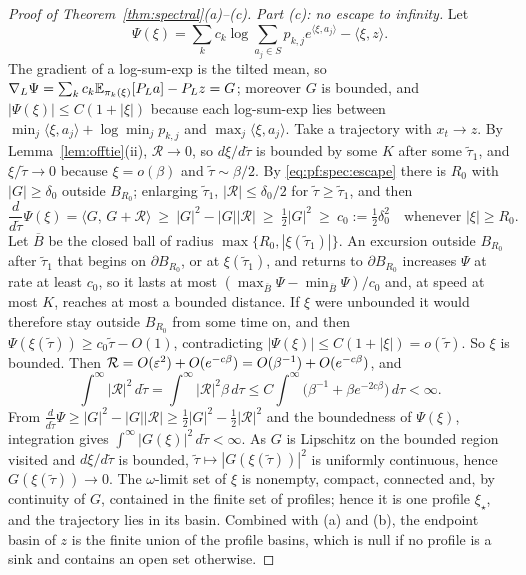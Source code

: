 \documentclass{article} %
\theoremstyle{plain}
\theoremstyle{definition}
\theoremstyle{remark}
\begin{document}
\begin{proof}[Proof of Theorem~\ref{thm:spectral}(a)--(c)]
\emph{Part (c): no escape to infinity.} Let
\[
\Psi(\xi)=\sum_kc_k\log\sum_{a_j\in S}p_{k,j}e^{\langle\xi,a_j\rangle}-\langle\xi,z\rangle .
\]
The gradient of a log-sum-exp is the tilted mean, so $\nabla_L\Psi=\sum_kc_k\mathbb{E}_{\pi_k(\xi)}[P_La]
-P_Lz=G$; moreover $G$ is bounded, and $|\Psi(\xi)|\le C(1+|\xi|)$ because each log-sum-exp lies
between $\min_j\langle\xi,a_j\rangle+\log\min_jp_{k,j}$ and $\max_j\langle\xi,a_j\rangle$. Take a
trajectory with $x_t\to z$. By Lemma~\ref{lem:offtie}(ii), $\mathcal R\to0$, so $d\xi/d\tilde\tau$ is
bounded by some $K$ after some $\tilde\tau_1$, and $\xi/\tilde\tau\to0$ because $\xi=o(\beta)$ and
$\tilde\tau\sim\beta/2$. By \eqref{eq:pf:spec:escape} there is $R_0$ with $|G|\ge\delta_0$ outside
$B_{R_0}$; enlarging $\tilde\tau_1$, $|\mathcal R|\le\delta_0/2$ for $\tilde\tau\ge\tilde\tau_1$, and then
\[
\frac{d}{d\tilde\tau}\Psi(\xi)=\langle G,\,G+\mathcal R\rangle\ \ge\ |G|^2-|G||\mathcal R|
\ \ge\ \tfrac12|G|^2\ \ge\ c_0:=\tfrac12\delta_0^2
\quad\text{whenever }|\xi|\ge R_0 .
\]
Let $\overline B$ be the closed ball of radius $\max\{R_0,|\xi(\tilde\tau_1)|\}$. An excursion outside
$B_{R_0}$ after $\tilde\tau_1$ that begins on $\partial B_{R_0}$, or at $\xi(\tilde\tau_1)$, and returns to
$\partial B_{R_0}$ increases $\Psi$ at rate at least $c_0$, so it lasts at most
$(\max_{\overline B}\Psi-\min_{\overline B}\Psi)/c_0$ and, at speed at most $K$, reaches at most a
bounded distance. If $\xi$ were unbounded it would therefore stay outside $B_{R_0}$ from some time
on, and then $\Psi(\xi(\tilde\tau))\ge c_0\tilde\tau-O(1)$, contradicting
$|\Psi(\xi)|\le C(1+|\xi|)=o(\tilde\tau)$. So $\xi$ is bounded. Then $\mathcal R=O(\varepsilon^2)+O(e^{-c\beta})
=O(\beta^{-1})+O(e^{-c\beta})$, and
\[
\int^\infty|\mathcal R|^2\,d\tilde\tau=\int^\infty|\mathcal R|^2\beta\,d\tau
\le C\int^\infty\bigl(\beta^{-1}+\beta e^{-2c\beta}\bigr)\,d\tau<\infty .
\]
From $\frac{d}{d\tilde\tau}\Psi\ge|G|^2-|G||\mathcal R|\ge\frac12|G|^2-\frac12|\mathcal R|^2$ and the
boundedness of $\Psi(\xi)$, integration gives $\int^\infty|G(\xi)|^2\,d\tilde\tau<\infty$. As $G$ is
Lipschitz on the bounded region visited and $d\xi/d\tilde\tau$ is bounded, $\tilde\tau\mapsto|G(\xi(\tilde\tau))|^2$
is uniformly continuous, hence $G(\xi(\tilde\tau))\to0$. The $\omega$-limit set of $\xi$ is nonempty,
compact, connected and, by continuity of $G$, contained in the finite set of profiles; hence it
is one profile $\xi_\star$, and the trajectory lies in its basin. Combined with (a) and (b), the
endpoint basin of $z$ is the finite union of the profile basins, which is null if no profile is a
sink and contains an open set otherwise.
\end{proof}
\end{document}
